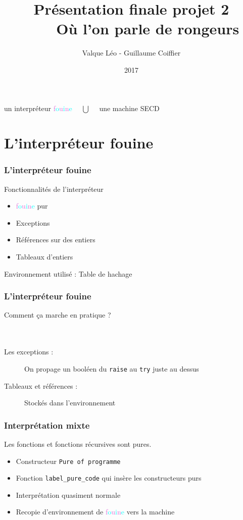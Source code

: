\documentclass[xcolor=dvipsnames]{beamer}
\title{Présentation finale projet 2 \\ ~ ~ Où l'on parle de rongeurs}
\author{Valque Léo - Guillaume Coiffier}
\institute{ENS de Lyon}
\date{2017}
\newcommand{\fouine}{\textsf{\textcolor{Orchid}{f}\textcolor{Cyan}{o}\textcolor{Orchid}{u}\textcolor{Cyan}{i}\textcolor{Orchid}{n}\textcolor{Cyan}{e} }}
\begin{document}
\maketitle

\begin{frame}
 \centering
 \Large un interpréteur \fouine $\quad \bigcup \quad $ une machine SECD
\end{frame}

\section{L'interpréteur fouine}

\begin{frame}
\frametitle{L'interpréteur fouine}
  Fonctionnalités de l'interpréteur
  \begin{itemize}
   \item \fouine pur \pause
   \item Exceptions \pause
   \item Références sur des entiers \pause
   \item Tableaux d'entiers \pause
  \end{itemize}
  Environnement utilisé : Table de hachage
\end{frame}

\begin{frame}
\frametitle{L'interpréteur fouine}
  Comment ça marche en pratique ? \\ ~ \\ \pause
  \begin{description}
   \item[Les exceptions :] On propage un booléen du \texttt{raise} au \texttt{try} juste au dessus \pause
   \item[Tableaux et références :] Stockés dans l'environnement
  \end{description}
\end{frame}

\begin{frame}
\frametitle{Interprétation mixte}
  Les fonctions et fonctions récursives sont pures. \pause
 \begin{itemize}
   \item Constructeur \texttt{Pure of programme} \pause
   \item Fonction \texttt{label\_pure\_code} qui insère les constructeurs purs \pause
   \item Interprétation quasiment normale \pause
   \item Recopie d'environnement de \fouine vers la machine
  \end{itemize}
\end{frame}
\end{document}
